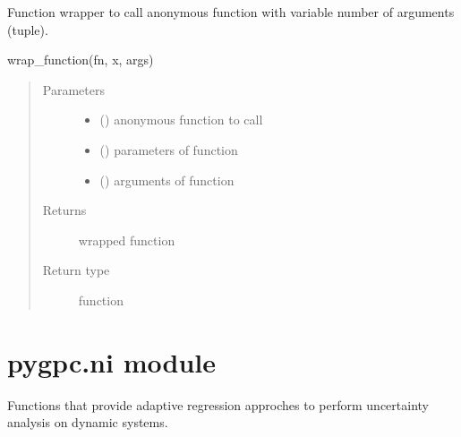 \documentclass[letterpaper,10pt,english,openany,oneside]{sphinxmanual}
\begin{document}
\begin{fulllineitems}
\label{\detokenize{pygpc:pygpc.misc.wrap_function}}
Function wrapper to call anonymous function with variable number of arguments (tuple).

wrap\_function(fn, x, args)
\begin{quote}\begin{description}
\item[{Parameters}] \leavevmode\begin{itemize}
\item {} 
 () \textendash{} anonymous function to call

\item {} 
 () \textendash{} parameters of function

\item {} 
 () \textendash{} arguments of function

\end{itemize}

\item[{Returns}] \leavevmode
{} \textendash{} wrapped function

\item[{Return type}] \leavevmode
function

\end{description}\end{quote}

\end{fulllineitems}



\section{pygpc.ni module}
\label{\detokenize{pygpc:module-pygpc.ni}}\label{\detokenize{pygpc:pygpc-ni-module}}
Functions that provide adaptive regression approches to perform uncertainty analysis on dynamic systems.
\end{document}
